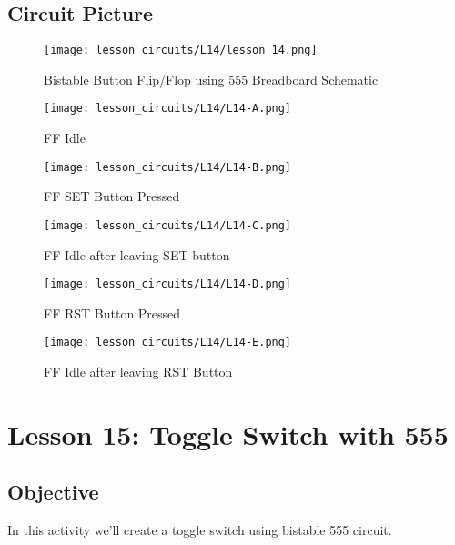 \subsection{Circuit Picture}
\begin{figure}[!hp]
    \centering
    \texttt{[image: lesson\_circuits/L14/lesson\_14.png]}
    \caption{Bistable Button Flip/Flop using 555 Breadboard Schematic}
    \label{fig:555_ff_sch}
\end{figure}
\begin{figure}[!hp]
    \centering
    \texttt{[image: lesson\_circuits/L14/L14-A.png]}
    \caption{FF Idle}
    \label{fig:555_ff_obb}
\end{figure}
\begin{figure}[!hp]
    \centering
    \texttt{[image: lesson\_circuits/L14/L14-B.png]}
    \caption{FF SET Button Pressed}
    \label{fig:555_ff_obb1}
\end{figure}
\begin{figure}[!hp]
    \centering
    \texttt{[image: lesson\_circuits/L14/L14-C.png]}
    \caption{FF Idle after leaving SET button}
    \label{fig:555_ff_obb2}
\end{figure}
\begin{figure}[!hp]
    \centering
    \texttt{[image: lesson\_circuits/L14/L14-D.png]}
    \caption{FF RST Button Pressed}
    \label{fig:555_ff_obb3}
\end{figure}
\begin{figure}[!hp]
    \centering
    \texttt{[image: lesson\_circuits/L14/L14-E.png]}
    \caption{FF Idle after leaving RST Button}
    \label{fig:555_ff_obb4}
\end{figure}
\section{Lesson 15: Toggle Switch with 555}
\subsection{Objective}
In this activity we'll create a toggle switch using bistable 555 circuit.
